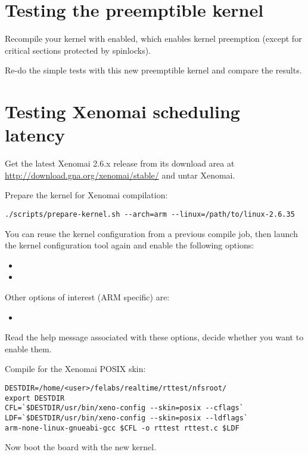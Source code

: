 \section{Testing the preemptible kernel}

Recompile your kernel with  enabled, which
enables kernel preemption (except for critical sections protected by
spinlocks).

Re-do the simple tests with this new preemptible kernel and compare
the results.

\section{Testing Xenomai scheduling latency}

Get the latest Xenomai 2.6.x release from its download area at
\url{http://download.gna.org/xenomai/stable/} and untar Xenomai.

Prepare the kernel for Xenomai compilation:
\begin{verbatim}
./scripts/prepare-kernel.sh --arch=arm --linux=/path/to/linux-2.6.35
\end{verbatim}

You can reuse the kernel configuration from a previous compile job,
then launch the kernel configuration tool again and enable the following
options:
\begin{itemize}
\item {}
\item {}
\end{itemize}

Other options of interest (ARM specific) are:
\begin{itemize}
\item {}
\end{itemize}

Read the help message associated with these options, decide whether you want
to enable them.

Compile  for the Xenomai POSIX skin:

\begin{verbatim}
DESTDIR=/home/<user>/felabs/realtime/rttest/nfsroot/
export DESTDIR
CFL=`$DESTDIR/usr/bin/xeno-config --skin=posix --cflags`
LDF=`$DESTDIR/usr/bin/xeno-config --skin=posix --ldflags`
arm-none-linux-gnueabi-gcc $CFL -o rttest rttest.c $LDF
\end{verbatim}

Now boot the board with the new kernel.

